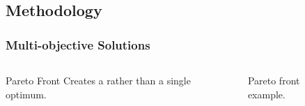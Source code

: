 \subsection{Methodology}
\begin{frame}
    \frametitle{Multi-objective Solutions}
    \begin{columns}
        \column[t]{4cm}
        \begin{block}{Pareto Front}
            Creates a  rather than a single optimum.
        \end{block}
        \column[t]{6cm}
        \begin{figure}
            \centering
            \resizebox{\columnwidth}{!}{}
            \caption{Pareto front example.}
            \label{fig:pareto-front}
        \end{figure}
    
    \end{columns}
    
\end{frame}

